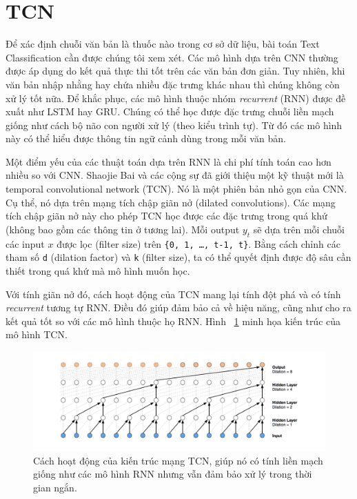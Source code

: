 \section{TCN}

Để xác định chuỗi văn bản là thuốc nào trong cơ sở dữ liệu, bài toán Text Classification cần được chúng tôi xem xét. Các mô hình dựa trên CNN thường được áp dụng do kết quả thực thi tốt trên các văn bản đơn giản. Tuy nhiên, khi văn bản nhập nhằng hay chứa nhiều đặc trưng khác nhau thì chúng không còn xử lý tốt nữa. Để khắc phục, các mô hình thuộc nhóm \textit{recurrent} (RNN) được đề xuất như LSTM hay GRU. Chúng có thể học được đặc trưng chuỗi liền mạch giống như cách bộ não con người xử lý (theo kiểu trình tự). Từ đó các mô hình này có thể hiểu được thông tin ngữ cảnh dùng trong mỗi văn bản.

Một điểm yếu của các thuật toán dựa trên RNN là chi phí tính toán cao hơn nhiều so với CNN. Shaojie Bai và các cộng sự \cite{bai2018empirical} đã giới thiệu một kỹ thuật mới là temporal convolutional network (TCN). Nó là một phiên bản nhỏ gọn của CNN. Cụ thể, nó dựa trên mạng tích chập giãn nở (dilated convolutions). Các mạng tích chập giãn nở này cho phép TCN học được các đặc trưng trong quá khứ (không bao gồm các thông tin ở tương lai). Mỗi output $y_t$ sẽ dựa trên mỗi chuỗi các input $x$ được lọc (filter size) trên \verb|{0, 1, …, t-1, t}|. Bằng cách chỉnh các tham số \verb|d| (dilation factor) và \verb|k| (filter size), ta có thể quyết định được độ sâu cần thiết trong quá khứ mà mô hình muốn học. 

Với tính giãn nở đó, cách hoạt động của TCN mang lại tính đột phá và có tính \textit{recurrent} tương tự RNN. Điều đó giúp đảm bảo cả về hiệu năng, cũng như cho ra kết quả tốt so với các mô hình thuộc họ RNN. Hình ~\ref{tcn} minh họa kiến trúc của mô hình TCN.

\begin{figure}
\centering
\includegraphics[width=1.0\textwidth]{mep_img/TCN.png}
\caption{Cách hoạt động của kiến trúc mạng TCN, giúp nó có tính liền mạch giống như các mô hình RNN nhưng vẫn đảm bảo xử lý trong thời gian ngắn.}\label{tcn}

\end{figure}

